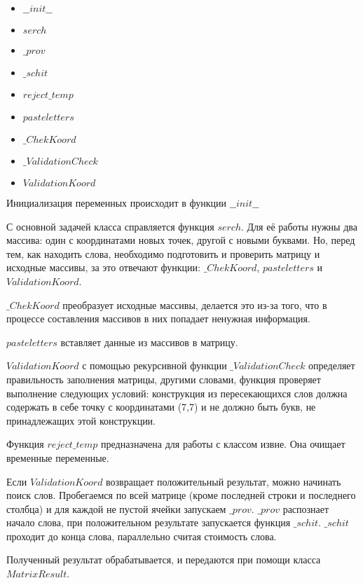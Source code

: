 \documentclass[a4paper,14pt]{article}
\begin{document}
	\begin {itemize}
		\item$\_\_init\_\_$
		\item $serch$	
		
		\item $\_prov$
		\item $\_schit$
		\item $reject\_temp$
		
		\item $pasteletters$
		\item $\_ChekKoord$
		\item $\_ValidationCheck$	
		\item $ValidationKoord$
	\end {itemize}
	
	Инициализация переменных происходит в функции $\_\_init\_\_$
	
	С основной задачей класса справляется функция $serch$. Для её работы нужны два массива: один с координатами новых точек, другой с новыми буквами. Но, перед тем, как находить слова, необходимо подготовить и проверить матрицу и исходные массивы, за это отвечают функции: $\_ChekKoord$, $pasteletters$ и $ValidationKoord$.
	
	$\_ChekKoord$ преобразует исходные массивы, делается это из-за того, что в процессе составления массивов в них попадает ненужная информация.
	
	$pasteletters$ вставляет данные из массивов в матрицу.
	
	$ValidationKoord$ с помощью рекурсивной функции $\_ValidationCheck$ определяет правильность заполнения матрицы, другими словами, функция проверяет выполнение следующих условий: конструкция из пересекающихся слов должна содержать в себе точку с координатами (7,7) и не должно быть букв, не принадлежащих этой конструкции.
	
	Функция $reject\_temp$ предназначена для работы с классом извне. Она очищает временные переменные.  
	
	Если $ValidationKoord$ возвращает положительный результат, можно начинать поиск слов. Пробегаемся по всей матрице (кроме последней строки и последнего столбца) и для каждой не пустой ячейки запускаем $\_prov$. $\_prov$ распознает начало слова, при положительном результате запускается функция $\_schit$. $\_schit$ проходит до конца слова, параллельно считая стоимость слова.
	
	Полученный результат обрабатывается, и передаются при помощи класса $MatrixResult$.
	
\end{document}
